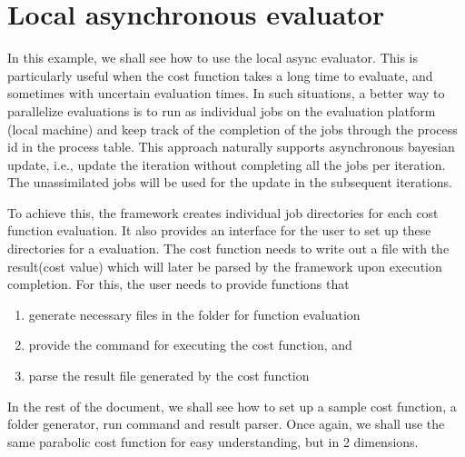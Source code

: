 \documentclass[letterpaper,12pt,english]{sphinxmanual}
\begin{document}
\section{Local asynchronous evaluator}
\label{\detokenize{examples/async_local_evaluator_example:local-asynchronous-evaluator}}\label{\detokenize{examples/async_local_evaluator_example:example-3}}\label{\detokenize{examples/async_local_evaluator_example::doc}}
\sphinxAtStartPar
In this example, we shall see how to use the local async evaluator. This is particularly useful when the cost function
takes a long time to evaluate, and sometimes with uncertain evaluation times. In such situations, a better way to
parallelize evaluations is to run as individual jobs on the evaluation platform (local machine) and keep track of
the completion of the jobs through the process id in the process table.
This approach naturally supports asynchronous bayesian update, i.e., update the iteration without completing all the
jobs per iteration. The un\sphinxhyphen{}assimilated jobs will be used for the update in the subsequent iterations.

\sphinxAtStartPar
To achieve this, the framework creates individual job directories for each cost function evaluation. It also provides
an interface for the user to set up these directories for a  evaluation. The cost function needs
to write out a file with the result(cost value) which will later be parsed by the framework upon execution completion.
For this, the user needs to provide functions that
\begin{enumerate}
%
\item {} 
\sphinxAtStartPar
generate necessary files in the folder for function evaluation

\item {} 
\sphinxAtStartPar
provide the command for executing the cost function, and

\item {} 
\sphinxAtStartPar
parse the result file generated by the cost function

\end{enumerate}

\sphinxAtStartPar
In the rest of the document, we shall see how to set up a sample cost function, a folder generator, run command and
result parser. Once again, we shall use the same parabolic cost function for easy understanding, but in 2 dimensions.
\end{document}
